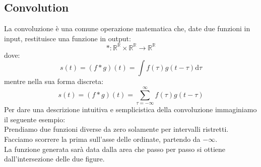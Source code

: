 \documentclass[12pt]{article}
\newcommand{\R}{\mathbb{R}}
\begin{document}

\subsection{Convolution}

La convoluzione è una comune operazione matematica che,
date due funzioni in input, restituisce una funzione in
output:
\begin{equation}*:\R^\R \times \R^\R \rightarrow \R^\R\end{equation}
dove:
\begin{equation}s(t)=(f*g)(t)=\int f(\tau)g(t-\tau) \mathrm{d}\tau\end{equation}
mentre nella sua forma discreta:
\begin{equation}s(t)=(f*g)(t)=\sum_{\tau=-\infty}^{\infty} f(\tau)g(t-\tau)\end{equation}
Per dare una descrizione intuitiva e semplicistica della convoluzione
immaginiamo il seguente esempio:\\
Prendiamo due funzioni diverse da zero solamente per intervalli ristretti.\\
Facciamo scorrere la prima sull'asse delle ordinate, partendo da $-\infty$.\\
La funzione generata sarà data dalla area che passo per passo si ottiene
dall'intersezione delle due figure.
\end{document}
